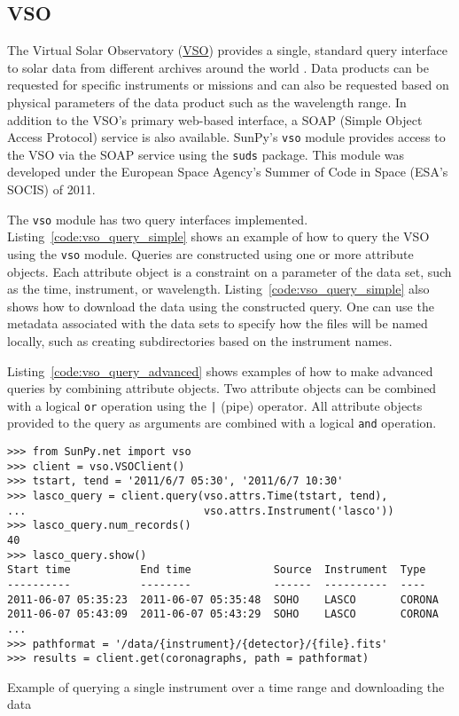 \subsection{VSO}\label{ssec:vso}

The Virtual Solar Observatory (\href{http://virtualsolar.org}{VSO}) provides a 
single, standard query interface to solar data from different archives 
around the world \citep{hill2009}.
Data products can be requested for specific instruments or missions and
can also be requested based on physical parameters of the data product such
as the wavelength range.
In addition to the VSO's primary web-based interface, a SOAP (Simple Object 
Access Protocol) service is also available.
SunPy's \texttt{vso} module provides access to the VSO via the SOAP service using the
\texttt{suds} package.
This module was developed under the European Space Agency's Summer of Code in 
Space (ESA's SOCIS) of 2011.

The \texttt{vso} module has two query interfaces implemented.
Listing~\ref{code:vso_query_simple} shows an example of how to query the VSO
using the \texttt{vso} module.
Queries are constructed using one or more attribute objects. Each
attribute object is a constraint on a parameter of the data set, such as the
time, instrument, or wavelength.
Listing~\ref{code:vso_query_simple} also shows how to download the data using
the constructed query. One can use the metadata associated with the data sets to 
specify how the files will be named locally, such as creating subdirectories 
based on the instrument names.

Listing~\ref{code:vso_query_advanced} shows examples of how to make advanced
queries by combining attribute objects.
Two attribute objects can be combined with a logical \texttt{or} operation
using the \texttt{|} (pipe) operator.
All attribute objects provided to the query as arguments are combined with a 
logical \texttt{and} operation.

\begin{listing}[H]
\begin{verbatim}
>>> from SunPy.net import vso
>>> client = vso.VSOClient()
>>> tstart, tend = '2011/6/7 05:30', '2011/6/7 10:30'
>>> lasco_query = client.query(vso.attrs.Time(tstart, tend),
...                            vso.attrs.Instrument('lasco'))
>>> lasco_query.num_records()
40
>>> lasco_query.show() 
Start time           End time             Source  Instrument  Type
----------           --------             ------  ----------  ----
2011-06-07 05:35:23  2011-06-07 05:35:48  SOHO    LASCO       CORONA
2011-06-07 05:43:09  2011-06-07 05:43:29  SOHO    LASCO       CORONA
...
>>> pathformat = '/data/{instrument}/{detector}/{file}.fits'
>>> results = client.get(coronagraphs, path = pathformat)
\end{verbatim}
\caption{Example of querying a single instrument over a time range and downloading the data}
\label{code:vso_query_simple}
\end{listing}


